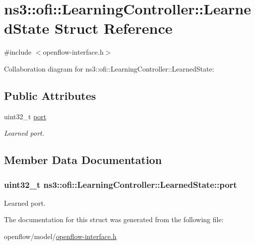 \hypertarget{structns3_1_1ofi_1_1LearningController_1_1LearnedState}{}\section{ns3\+:\+:ofi\+:\+:Learning\+Controller\+:\+:Learned\+State Struct Reference}
\label{structns3_1_1ofi_1_1LearningController_1_1LearnedState}


{\ttfamily \#include $<$openflow-\/interface.\+h$>$}



Collaboration diagram for ns3\+:\+:ofi\+:\+:Learning\+Controller\+:\+:Learned\+State\+:
\subsection*{Public Attributes}
\begin{DoxyCompactItemize}
\item 
uint32\+\_\+t \hyperlink{structns3_1_1ofi_1_1LearningController_1_1LearnedState_aa78655e41a7568e23f4d8078ab645804}{port}
\begin{DoxyCompactList}\small\item\em Learned port. \end{DoxyCompactList}\end{DoxyCompactItemize}


\subsection{Member Data Documentation}
\subsubsection[{\texorpdfstring{port}{port}}]{\setlength{\rightskip}{0pt plus 5cm}uint32\+\_\+t ns3\+::ofi\+::\+Learning\+Controller\+::\+Learned\+State\+::port}\hypertarget{structns3_1_1ofi_1_1LearningController_1_1LearnedState_aa78655e41a7568e23f4d8078ab645804}{}\label{structns3_1_1ofi_1_1LearningController_1_1LearnedState_aa78655e41a7568e23f4d8078ab645804}


Learned port. 



The documentation for this struct was generated from the following file\+:\begin{DoxyCompactItemize}
\item 
openflow/model/\hyperlink{openflow-interface_8h}{openflow-\/interface.\+h}\end{DoxyCompactItemize}
